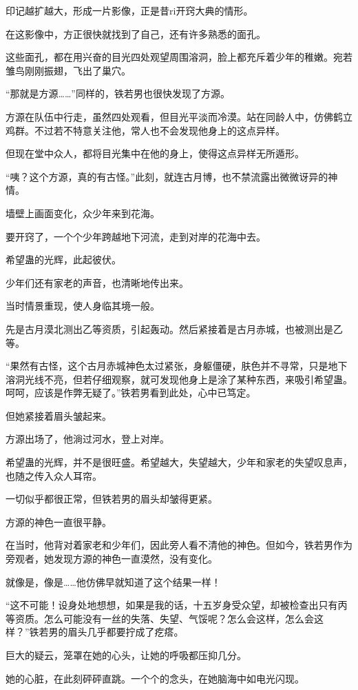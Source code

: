 \begin{this_body}
印记越扩越大，形成一片影像，正是昔ri开窍大典的情形。

在这影像中，方正很快就找到了自己，还有许多熟悉的面孔。

这些面孔，都在用兴奋的目光四处观望周围溶洞，脸上都充斥着少年的稚嫩。宛若雏鸟刚刚振翅，飞出了巢穴。

“那就是方源……”同样的，铁若男也很快发现了方源。

方源在队伍中行走，虽然四处观看，但目光平淡而冷漠。站在同龄人中，仿佛鹤立鸡群。不过若不特意关注他，常人也不会发现他身上的这点异样。

但现在堂中众人，都将目光集中在他的身上，使得这点异样无所遁形。

“咦？这个方源，真的有古怪。”此刻，就连古月博，也不禁流露出微微讶异的神情。

墙壁上画面变化，众少年来到花海。

要开窍了，一个个少年跨越地下河流，走到对岸的花海中去。

希望蛊的光辉，此起彼伏。

少年们还有家老的声音，也清晰地传出来。

当时情景重现，使人身临其境一般。

先是古月漠北测出乙等资质，引起轰动。然后紧接着是古月赤城，也被测出是乙等。

“果然有古怪，这个古月赤城神色太过紧张，身躯僵硬，肤色并不寻常，只是地下溶洞光线不亮，但若仔细观察，就可发现他身上是涂了某种东西，来吸引希望蛊。呵呵，应该是作弊无疑了。”铁若男看到此处，心中已笃定。

但她紧接着眉头皱起来。

方源出场了，他淌过河水，登上对岸。

希望蛊的光辉，并不是很旺盛。希望越大，失望越大，少年和家老的失望叹息声，也随之传入众人耳帘。

一切似乎都很正常，但铁若男的眉头却皱得更紧。

方源的神色一直很平静。

在当时，他背对着家老和少年们，因此旁人看不清他的神色。但如今，铁若男作为旁观者，她发现方源的神色一直漠然，没有变化。

就像是，像是……他仿佛早就知道了这个结果一样！

“这不可能！设身处地想想，如果是我的话，十五岁身受众望，却被检查出只有丙等资质。怎么可能没有一丝的失落、失望、气馁呢？怎么会这样，怎么会这样？”铁若男的眉头几乎都要拧成了疙瘩。

巨大的疑云，笼罩在她的心头，让她的呼吸都压抑几分。

她的心脏，在此刻砰砰直跳。一个个的念头，在她脑海中如电光闪现。


\end{this_body}
